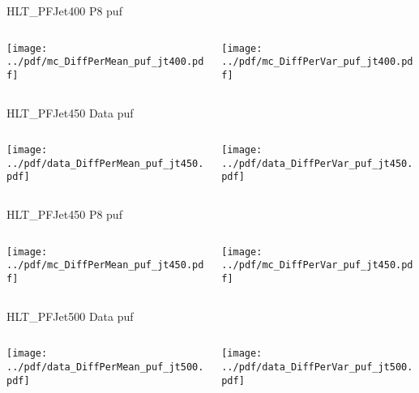 \documentclass[9pt]{beamer}
\begin{document}
\begin{frame}[t]{HLT\_PFJet400 P8 puf}
\begin{columns}[T]
  \begin{column}{.5\textwidth}
  \texttt{[image: ../pdf/mc\_DiffPerMean\_puf\_jt400.pdf]}
  \end{column}
  \begin{column}{.5\textwidth}
  \texttt{[image: ../pdf/mc\_DiffPerVar\_puf\_jt400.pdf]}
  \end{column}
\end{columns}
\end{frame}

\begin{frame}[t]{HLT\_PFJet450 Data puf}
\begin{columns}[T]
  \begin{column}{.5\textwidth}
  \texttt{[image: ../pdf/data\_DiffPerMean\_puf\_jt450.pdf]}
  \end{column}
  \begin{column}{.5\textwidth}
  \texttt{[image: ../pdf/data\_DiffPerVar\_puf\_jt450.pdf]}
  \end{column}
\end{columns}
\end{frame}

\begin{frame}[t]{HLT\_PFJet450 P8 puf}
\begin{columns}[T]
  \begin{column}{.5\textwidth}
  \texttt{[image: ../pdf/mc\_DiffPerMean\_puf\_jt450.pdf]}
  \end{column}
  \begin{column}{.5\textwidth}
  \texttt{[image: ../pdf/mc\_DiffPerVar\_puf\_jt450.pdf]}
  \end{column}
\end{columns}
\end{frame}

\begin{frame}[t]{HLT\_PFJet500 Data puf}
\begin{columns}[T]
  \begin{column}{.5\textwidth}
  \texttt{[image: ../pdf/data\_DiffPerMean\_puf\_jt500.pdf]}
  \end{column}
  \begin{column}{.5\textwidth}
  \texttt{[image: ../pdf/data\_DiffPerVar\_puf\_jt500.pdf]}
  \end{column}
\end{columns}
\end{frame}
\end{document}
